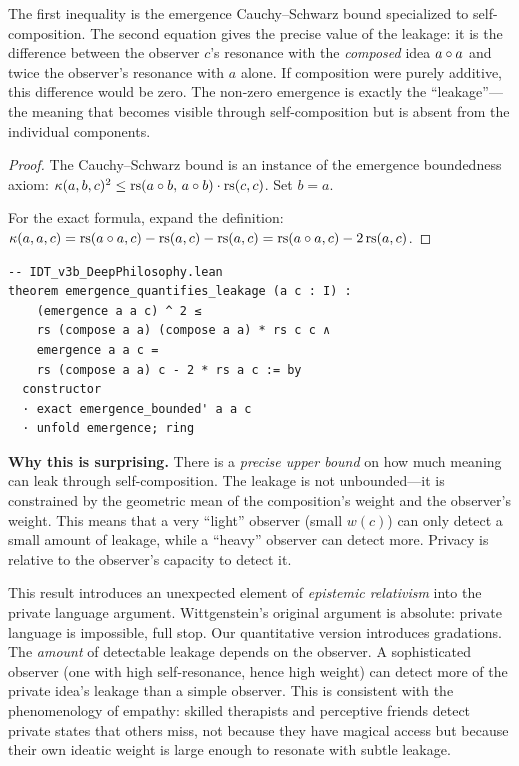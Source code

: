The first inequality is the emergence Cauchy--Schwarz bound specialized
to self-composition. The second equation gives the precise value of the
leakage: it is the difference between the observer $c$'s resonance with
the \emph{composed} idea $a \circ a$ and twice the observer's
resonance with $a$ alone. If composition were purely additive, this
difference would be zero. The non-zero emergence is exactly the
``leakage''---the meaning that becomes visible through self-composition
but is absent from the individual components.

\begin{proof}
The Cauchy--Schwarz bound is an instance of the emergence boundedness
axiom: $\kappa(a, b, c)^2 \leq \mathrm{rs}(a \circ b,\, a \circ b)
\cdot \mathrm{rs}(c, c)$. Set $b = a$.

For the exact formula, expand the definition:
$\kappa(a, a, c) = \mathrm{rs}(a \circ a, c) - \mathrm{rs}(a, c) - \mathrm{rs}(a, c)
= \mathrm{rs}(a \circ a, c) - 2\,\mathrm{rs}(a, c)$.
\end{proof}

\begin{lstlisting}
-- IDT_v3b_DeepPhilosophy.lean
theorem emergence_quantifies_leakage (a c : I) :
    (emergence a a c) ^ 2 ≤
    rs (compose a a) (compose a a) * rs c c ∧
    emergence a a c =
    rs (compose a a) c - 2 * rs a c := by
  constructor
  · exact emergence_bounded' a a c
  · unfold emergence; ring
\end{lstlisting}

\begin{surprisebox}
\textbf{Why this is surprising.} There is a \emph{precise upper bound}
on how much meaning can leak through self-composition. The leakage is
not unbounded---it is constrained by the geometric mean of the
composition's weight and the observer's weight. This means that a very
``light'' observer (small $w(c)$) can only detect a small amount of
leakage, while a ``heavy'' observer can detect more. Privacy is relative
to the observer's capacity to detect it.
\end{surprisebox}

This result introduces an unexpected element of \emph{epistemic
relativism} into the private language argument. Wittgenstein's original
argument is absolute: private language is impossible, full stop. Our
quantitative version introduces gradations. The \emph{amount} of
detectable leakage depends on the observer. A sophisticated observer
(one with high self-resonance, hence high weight) can detect more of the
private idea's leakage than a simple observer. This is consistent with
the phenomenology of empathy: skilled therapists and perceptive friends
detect private states that others miss, not because they have magical
access but because their own ideatic weight is large enough to resonate
with subtle leakage.

